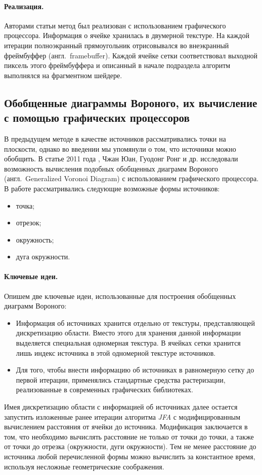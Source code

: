 \documentclass[12pt]{article}
\begin{document}
\paragraph{Реализация.} Авторами статьи метод был реализован с использованием 
графического процессора. Информация о ячейке хранилась в двумерной текстуре. 
На каждой итерации полноэкранный прямоугольник отрисовывался во внеэкранный
фреймбуффер (англ.~framebuffer). Каждой ячейке сетки соответствовал выходной
пиксель этого фреймбуффера и описанный в начале подраздела алгоритм
выполнялся на фрагментном шейдере.

\subsection{Обобщенные диаграммы Вороного, их вычисление с помощью графических 
процессоров}
\label{gvd}
В предыдущем методе в качестве источников рассматривались точки на плоскости, 
однако во введении мы упомянули о том, что источники можно обобщить. В статье 
2011 года \cite{gvd}, Чжан Юан, Гуодонг Ронг и др. исследовали возможность
вычисления подобных обобщенных диаграмм Вороного (англ.~Generalized Voronoi
Diagram) с использованием графического  процессора. В работе рассматривались 
следующие возможные формы источников:

\begin{itemize}
\item точка;
\item отрезок;
\item окружность;
\item дуга окружности.
\end{itemize}

\paragraph{Ключевые идеи.} Опишем две ключевые идеи, использованные для
построения обобщенных диаграмм Вороного:
\begin{itemize}
\item Информация об источниках хранится отдельно от текстуры, представляющей
дискретизацию области. Вместо этого для хранения данной информации выделяется 
специальная одномерная текстура. В ячейках сетки хранится лишь индекс 
источника в этой одномерной текстуре источников.
\item Для того, чтобы внести информацию об источниках в равномерную сетку 
до первой итерации, применялись стандартные средства растеризации, реализованные 
в современных графических библиотеках.
\end{itemize}
Имея дискретизацию области с информацией об источниках далее остается
запустить изложенные ранее итерации алгоритма \emph{JFA} с модифицированным 
вычислением расстояния от ячейки до источника. Модификация заключается в том, что
необходимо вычислять расстояние не только от точки до точки, а также от точки до отрезка 
(окружности, дуги окружности). Тем не менее расстояние до источника любой
перечисленной формы можно вычислить за константное время, 
используя несложные геометрические соображения.
\end{document}
